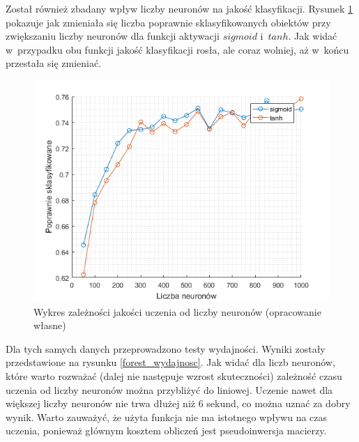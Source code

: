 \documentclass[pl]{minipw} %
\begin{document}
Został również zbadany wpływ liczby neuronów na jakość klasyfikacji.
Rysunek \ref{forest_liczba_neuronow} pokazuje jak zmieniała się liczba poprawnie sklasyfikowanych obiektów przy zwiększaniu liczby neuronów dla funkcji aktywacji $sigmoid$ i~$tanh$.
Jak widać w~przypadku obu funkcji jakość klasyfikacji rosła, ale coraz wolniej, aż w~końcu przestała się zmieniać.
\begin{figure}[H]
\centering
\includegraphics[width=\textwidth]{forest_liczba_neuronow.png}
\caption[Wykres zależności jakości uczenia od liczby neuronów]{Wykres zależności jakości uczenia od liczby neuronów (opracowanie własne)}
\label{forest_liczba_neuronow}
\end{figure}

Dla tych samych danych przeprowadzono testy wydajności.
Wyniki zostały przedstawione na rysunku \ref{forest_wydajnosc}.
Jak widać dla liczb neuronów, które warto rozważać (dalej nie następuje wzrost skuteczności) zależność czasu uczenia od liczby neuronów można przybliżyć do liniowej.
Uczenie nawet dla większej liczby neuronów nie trwa dłużej niż 6 sekund, co można uznać za dobry wynik.
Warto zauważyć, że użyta funkcja nie ma istotnego wpływu na czas uczenia, ponieważ głównym kosztem obliczeń jest pseudoinwersja macierzy.
\end{document}
